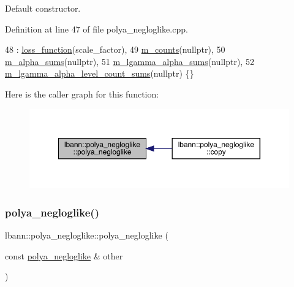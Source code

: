 Default constructor. 

Definition at line 47 of file polya\+\_\+negloglike.\+cpp.


\begin{DoxyCode}
48   : \hyperlink{classlbann_1_1loss__function_a0c5745e661c59e3e5496888d233c07cf}{loss\_function}(scale\_factor),
49     \hyperlink{classlbann_1_1polya__negloglike_a441387814cd7deafb1f70c91926d3004}{m\_counts}(\textcolor{keyword}{nullptr}),
50     \hyperlink{classlbann_1_1polya__negloglike_aa77620f256de700ae8b3ca921957bcd1}{m\_alpha\_sums}(\textcolor{keyword}{nullptr}),
51     \hyperlink{classlbann_1_1polya__negloglike_a0aec768ffa50a8b716149d597699eddb}{m\_lgamma\_alpha\_sums}(\textcolor{keyword}{nullptr}),
52     \hyperlink{classlbann_1_1polya__negloglike_a78c9da1fb83c7b79a12cfbf30a4cb59e}{m\_lgamma\_alpha\_level\_count\_sums}(\textcolor{keyword}{nullptr}) \{\}
\end{DoxyCode}
Here is the caller graph for this function\+:\nopagebreak
\begin{figure}[H]
\begin{center}
\leavevmode
\includegraphics[width=350pt]{classlbann_1_1polya__negloglike_a3f3c7f775d548ac8e011fb1b637804cb_icgraph}
\end{center}
\end{figure}
\mbox{\label{classlbann_1_1polya__negloglike_a35d76a08dea5203c4f70e48260adf1ec}} 
\subsubsection{\texorpdfstring{polya\+\_\+negloglike()}{polya\_negloglike()}\hspace{0.1cm}{\footnotesize\ttfamily [2/2]}}
{\footnotesize\ttfamily lbann\+::polya\+\_\+negloglike\+::polya\+\_\+negloglike (\begin{DoxyParamCaption}\item[{const \hyperlink{classlbann_1_1polya__negloglike}{polya\+\_\+negloglike} \&}]{other }\end{DoxyParamCaption})}

